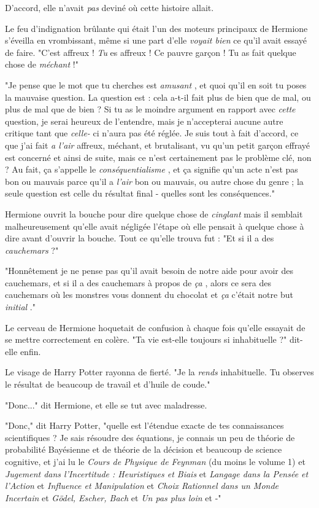D'accord, elle n'avait \emph{pas } deviné où cette histoire allait.

Le feu d'indignation brûlante qui était l'un des moteurs principaux de Hermione s'éveilla en vrombissant, même si une part d'elle \emph{voyait bien}  ce qu'il avait essayé de faire. "C'est affreux ! \emph{Tu}  es affreux ! Ce pauvre garçon ! Tu as fait quelque chose de \emph{méchant}  !"

"Je pense que le mot que tu cherches est \emph{amusant} , et quoi qu'il en soit tu poses la mauvaise question. La question est : cela a-t-il fait plus de bien que de mal, ou plus de mal que de bien ? Si tu as le moindre argument en rapport avec \emph{cette}  question, je serai heureux de l'entendre, mais je n'accepterai aucune autre critique tant que \emph{celle-} ci n'aura pas été réglée. Je suis tout à fait d'accord, ce que j'ai fait \emph{a l'air}  affreux, méchant, et brutalisant, vu qu'un petit garçon effrayé est concerné et ainsi de suite, mais ce n'est certainement pas le problème clé, non ? Au fait, ça s'appelle le \emph{conséquentialisme} , et ça signifie qu'un acte n'est pas bon ou mauvais parce qu'il a \emph{l'air}  bon ou mauvais, ou autre chose du genre ; la seule question est celle du résultat final - quelles sont les conséquences."

Hermione ouvrit la bouche pour dire quelque chose de \emph{cinglant}  mais il semblait malheureusement qu'elle avait négligée l'étape où elle pensait à quelque chose à dire avant d'ouvrir la bouche. Tout ce qu'elle trouva fut : "Et si il a des \emph{cauchemars}  ?"

"Honnêtement je ne pense pas qu'il avait besoin de notre aide pour avoir des cauchemars, et si il a des cauchemars à propos de \emph{ça} , alors ce sera des cauchemars où les monstres vous donnent du chocolat et \emph{ça}  c'était notre but \emph{initial} ."

Le cerveau de Hermione hoquetait de confusion à chaque fois qu'elle essayait de se mettre correctement en colère. "Ta vie est-elle toujours si inhabituelle ?" dit-elle enfin.

Le visage de Harry Potter rayonna de fierté. "Je la \emph{rends}  inhabituelle. Tu observes le résultat de beaucoup de travail et d'huile de coude."

"Donc..." dit Hermione, et elle se tut avec maladresse.

"Donc," dit Harry Potter, "quelle est l'étendue exacte de tes connaissances scientifiques ? Je sais résoudre des équations, je connais un peu de théorie de probabilité Bayésienne et de théorie de la décision et beaucoup de science cognitive, et j'ai lu le \emph{Cours de Physique de Feynman}  (du moins le volume 1) et \emph{Jugement dans l'Incertitude : Heuristiques et Biais}  et \emph{Langage dans la Pensée et l'Action}  et \emph{Influence et Manipulation}  et \emph{Choix Rationnel dans un Monde Incertain } et \emph{Gödel, Escher, Bach}  et \emph{Un pas plus loin}  et -"

